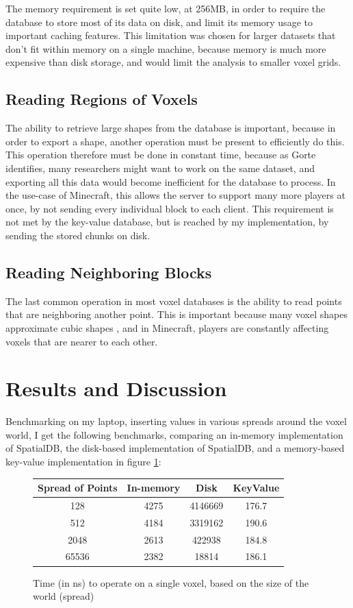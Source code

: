 \documentclass[10pt,twocolumn]{article}
\begin{document}
The memory requirement is set quite low, at 256MB, in order to require the
database to store most of its data on disk, and limit its memory usage to
important caching features. This limitation was chosen for larger datasets that
don't fit within memory on a single machine, because memory is much more
expensive than disk storage, and would limit the analysis to smaller voxel grids.

\subsection{Reading Regions of Voxels}

The ability to retrieve large shapes from the database is important, because in
order to export a shape, another operation must be present to efficiently do
this. This operation therefore must be done in constant time, because as
Gorte\cite{gorte2023analysis} identifies, many researchers might want to work
on the same dataset, and exporting all this data would become inefficient for
the database to process. In the use-case of Minecraft, this allows the server to
support many more players at once, by not sending every individual block to each
client. This requirement is not met by the key-value database, but is reached by
my implementation, by sending the stored chunks on disk.

\subsection{Reading Neighboring Blocks}

The last common operation in most voxel databases is the ability to read points
that are neighboring another point. This is important because many voxel shapes
approximate cubic shapes \cite{gorte2023analysis}, and in Minecraft, players are
constantly affecting voxels that are nearer to each other.

\section{Results and Discussion}

Benchmarking on my laptop, inserting values in various spreads around the voxel
world, I get the following benchmarks, comparing an in-memory implementation of
SpatialDB, the disk-based implementation of SpatialDB, and a memory-based
key-value implementation in figure \ref{fig:reads}:

\begin{figure}
  \centering
  \begin{tabular}{c | c | c | c}
    Spread of Points & In-memory & Disk & KeyValue\\
    \hline
    128 & 4275 & 4146669 & 176.7\\
    512 & 4184 & 3319162 & 190.6\\
    2048 & 2613 & 422938 & 184.8\\
    65536 & 2382 & 18814 & 186.1
  \end{tabular}
  \caption{Time (in ns) to operate on a single voxel, based on the size of the
  world (spread)}
  \label{fig:reads}
\end{figure}
\end{document}
